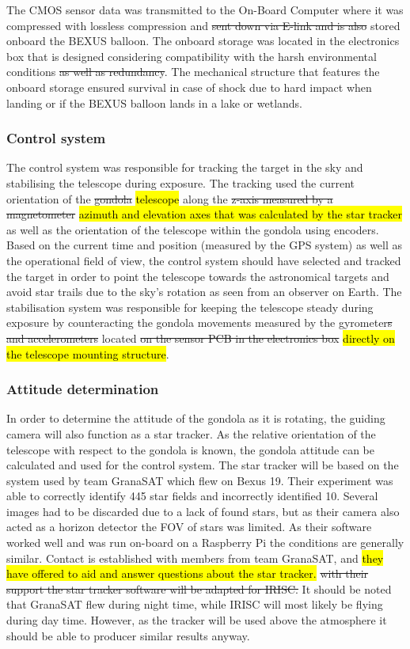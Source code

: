 The CMOS sensor data was transmitted to the On-Board Computer where it was compressed with lossless compression and \st{sent down via E-link and is also} stored onboard the BEXUS balloon. The onboard storage was located in the electronics box that is designed considering compatibility with the harsh environmental conditions \st{as well as redundancy}. The mechanical structure that features the onboard storage ensured survival in case of shock due to hard impact when landing or if the BEXUS balloon lands in a lake or wetlands.


\subsubsection{Control system}
The control system was responsible for tracking the target in the sky and stabilising the telescope during exposure. The tracking used the current orientation of the \st{gondola} \hl{telescope} along the \st{z-axis measured by a magnetometer} \hl{azimuth and elevation axes that was calculated by the star tracker} as well as the orientation of the telescope within the gondola using encoders. Based on the current time and position (measured by the GPS system) as well as the operational field of view, the control system should have selected and tracked the target in order to point the telescope towards the astronomical targets and avoid star trails due to the sky's rotation as seen from an observer on Earth. The stabilisation system was responsible for keeping the telescope steady during exposure by counteracting the gondola movements measured by the gyrometer\st{s and accelerometers} located \st{on the sensor PCB in the electronics box} \hl{directly on the telescope mounting structure}.


\subsubsection{Attitude determination}
\label{sec::4-1_attitude_determination}
In order to determine the attitude of the gondola as it is rotating, the guiding camera will also function as a star tracker. As the relative orientation of the telescope with respect to the gondola is known, the gondola attitude can be calculated and used for the control system. The star tracker will be based on the system used by team GranaSAT which flew on Bexus 19. Their experiment was able to correctly identify 445 star fields and incorrectly identified 10. Several images had to be discarded due to a lack of found stars, but as their camera also acted as a horizon detector the FOV of stars was limited. As their software worked well and was run on-board on a Raspberry Pi the conditions are generally similar. Contact is established with members from team GranaSAT, and \hl{they have offered to aid and answer questions about the star tracker.} \st{with their support the star tracker software will be adapted for IRISC.} It should be noted that GranaSAT flew during night time, while IRISC will most likely be flying during day time. However, as the tracker will be used above the atmosphere it should be able to producer similar results anyway.


